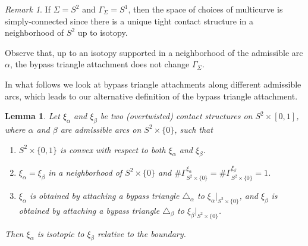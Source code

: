 \documentclass[12pt]{amsart}
\newtheorem{lemma}[thm]{Lemma}
\theoremstyle{remark}
\newtheorem{rmk}[thm]{Remark}
\newcommand{\be}{\begin{enumerate}}
\newcommand{\ee}{\end{enumerate}}
\begin{document}
\begin{rmk} \label{uniquetight}
If $\Sigma=S^2$ and $\Gamma_\Sigma=S^1$, then the space of choices of multicurve is simply-connected since there is a unique tight contact structure in a neighborhood of $S^2$ up to isotopy.
\end{rmk}

Observe that, up to an isotopy supported in a neighborhood of the admissible arc $\alpha$, the bypass triangle attachment does not change $\Gamma_\Sigma$.

In what follows we look at bypass triangle attachments along different admissible arcs, which leads to our alternative definition of the bypass triangle attachment.

\begin{lemma} \label{lemBTonS2}
Let $\xi_\alpha$ and $\xi_\beta$ be two (overtwisted) contact structures on $S^2\times[0,1]$, where $\alpha$ and $\beta$ are admissible arcs on $S^2\times\{0\}$, such that

\be
\item{$S^2\times\{0,1\}$ is convex with respect to both $\xi_\alpha$ and $\xi_\beta$.}
\item{$\xi_\alpha=\xi_\beta$ in a neighborhood of $S^2\times\{0\}$ and $\#\Gamma^{\xi_\alpha}_{S^2\times\{0\}}=\#\Gamma^{\xi_\beta}_{S^2\times\{0\}}=1$.}
\item{$\xi_\alpha$ is obtained by attaching a bypass triangle $\triangle_\alpha$ to $\xi_\alpha|_{S^2\times\{0\}}$, and $\xi_\beta$ is obtained by attaching a bypass triangle $\triangle_\beta$ to $\xi_\beta|_{S^2\times\{0\}}$.}
\ee

Then $\xi_\alpha$ is isotopic to $\xi_\beta$ relative to the boundary.
\end{lemma}
\end{document}
